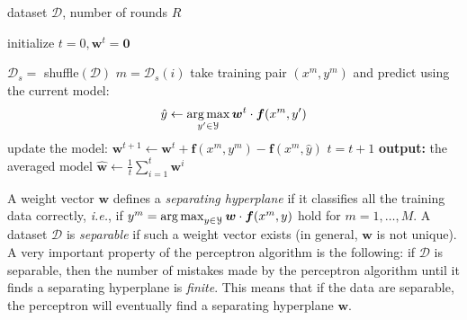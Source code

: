 \begin{algorithm}[t]

   \caption{\label{alg:perceptron} Averaged perceptron}

\begin{algorithmic}[1]

    dataset $\mathcal{D}$, number of rounds $R$

   \STATE initialize $t = 0, \boldsymbol{w}^t = \mathbf{0}$

         \STATE $\mathcal{D}_s =$ shuffle$(\mathcal{D})$
	\STATE $m = \mathcal{D}_s(i)$
	\STATE take training pair $(x^m, y^m)$ and predict using the current model: 
	$$\hat{y}  \leftarrow \operatorname*{arg\,max}_{y'\in\mathcal{Y}} \boldsymbol{w}^t \cdot \boldsymbol{f}(x^m,y')$$
	\STATE update the model: 
	$\boldsymbol{w}^{t+1} \leftarrow \boldsymbol{w}^{t} +
        \boldsymbol{f}(x^m,y^m) - \boldsymbol{f}(x^m,\hat{y})$
    \STATE $t = t+1$
        \ENDFOR
	\ENDFOR
   \STATE \textbf{output:} the averaged model $\hat{\boldsymbol{w}} \leftarrow \frac{1}{t}\sum_{i=1}^{t} \boldsymbol{w}^i$

\end{algorithmic}
 
%
%
%
%
%

\end{algorithm}



A weight vector $\boldsymbol{w}$ defines a \emph{separating hyperplane} if it classifies 
all the training data correctly, \emph{i.e.}, if $y^m = \operatorname*{arg\,max}_{y \in \mathcal{Y}} \boldsymbol{w} \cdot \boldsymbol{f}(x^m,y)$ 
hold for $m = 1,\ldots,M$. A dataset $\mathcal{D}$ is \emph{separable} 
if such a weight vector exists (in general, $\boldsymbol{w}$ is not unique). 
A very important property of the perceptron algorithm is the following: 
if $\mathcal{D}$ is separable, then the 
number of mistakes made by the perceptron algorithm until it finds a separating hyperplane is \emph{finite}.  
This means that if the data are separable, the perceptron will eventually find a separating hyperplane $\boldsymbol{w}$. 


